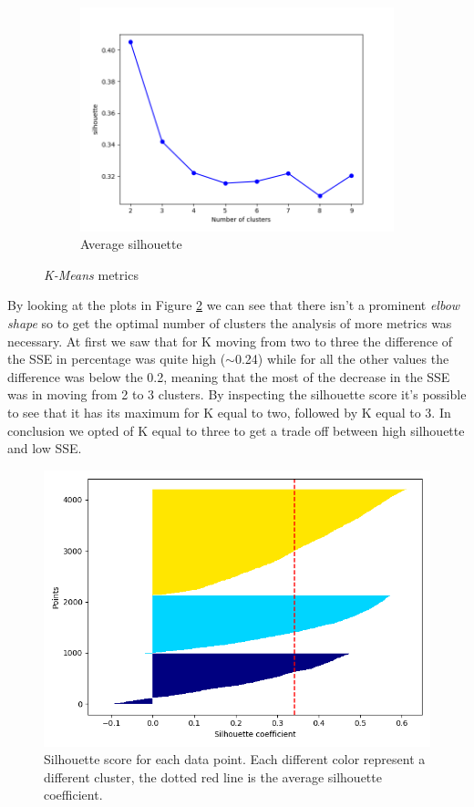 \begin{figure}[h!]
     \begin{subfigure}{0.49\textwidth}
         \centering
         \includegraphics[scale=0.4]{img/clust_1/sil.png}
         \caption{Average silhouette}
         \label{fig:sil_img}
     \end{subfigure}
     \caption{\emph{K-Means} metrics}
    \label{fig:km_metrics}
\end{figure}

By looking at the plots in Figure \ref{fig:km_metrics} we can see that there isn't a prominent \emph{elbow shape} so to get the optimal number of clusters the analysis of more metrics was necessary. At first we saw that for K moving from two to three the difference of the SSE in percentage was quite high ($\sim$0.24) while for all the other values the difference was below the 0.2, meaning that the most of the decrease in the SSE was in moving from 2 to 3 clusters. By inspecting the silhouette score it's possible to see that it has its maximum for K equal to two, followed by K equal to 3. In conclusion we opted of K equal to three to get a trade off between high silhouette and low SSE.

\begin{figure}[h!]
    \centering
    \includegraphics[scale=0.4]{img/clust_1/sil_tot.png}
    \caption{Silhouette score for each data point. Each different color represent a different cluster, the dotted red line is the average silhouette coefficient.}
    \label{fig:silhouette}
\end{figure}

